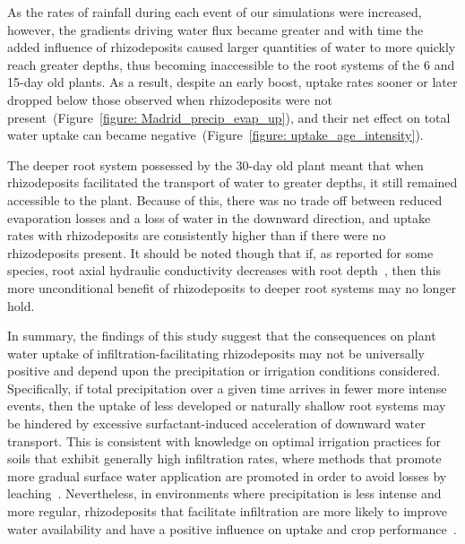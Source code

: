 \documentclass[11pt,a4paper]{article}
\numberwithin{equation}{section}
\begin{document}
As the rates of rainfall during each event of our simulations were increased, however, the gradients driving  water flux became greater and with time the added influence of rhizodeposits caused larger quantities of water to more quickly reach greater depths, thus becoming inaccessible to the root systems of the 6 and 15-day old plants. As a result, despite an early boost, uptake rates sooner or later dropped below those observed when rhizodeposits were not present~(Figure~\ref{figure: Madrid_precip_evap_up}), and their net effect on total water uptake can became negative~(Figure~\ref{figure: uptake_age_intensity}). 

The deeper root system possessed by the 30-day old plant meant that when rhizodeposits facilitated the transport of water to greater depths, it still remained accessible to the plant. Because of this, there was no trade off between reduced evaporation losses and a loss of water in the downward direction, and uptake rates with rhizodeposits are consistently higher than if there were no rhizodeposits present. It should be noted though that if, as reported for some species, root axial hydraulic conductivity decreases with root depth~\cite{clement2022root}, then this more unconditional benefit of rhizodeposits to deeper root systems may no longer hold. 

In summary, the findings of this study suggest that the consequences on plant water uptake of infiltration-facilitating rhizodeposits may not be universally positive and depend upon the precipitation or irrigation conditions considered. Specifically, if total precipitation over a given time arrives in fewer more intense events, then the uptake of less developed or naturally shallow root systems may be hindered by excessive surfactant-induced acceleration of downward water transport. This is consistent with knowledge on optimal irrigation practices for soils that exhibit generally high infiltration rates, where methods that promote more gradual surface water application are promoted in order to avoid losses by leaching~\citep{blackwell2000management, alhammadi2013irrigation}. Nevertheless, in environments where precipitation is less intense and more regular, rhizodeposits that facilitate infiltration are more likely to improve water availability and have a positive influence on uptake and crop performance~\citep{oostindie2010influence, chaichi2015surfactant}.            
  
\end{document}
